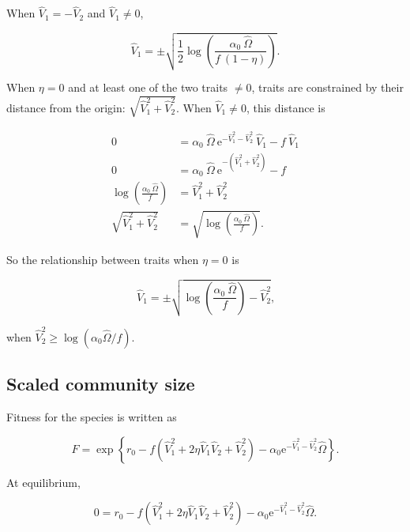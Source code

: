 When $\hat{V}_{1} = - \hat{V}_{2}$ and $\hat{V}_{1} \ne 0$,

$$
    \hat{V}_{1} = \pm \sqrt{\frac{1}{2}
        \log \left( \frac{ \alpha_0 ~ \hat{\Omega} }{ f ~ ( 1 - \eta ) } \right) }
    \textrm{.}
$$


When $\eta = 0$ and at least one of the two traits $\ne 0$,
traits are constrained by their distance
from the origin: $\sqrt{\hat{V}_{1}^2 + \hat{V}_{2}^2}$.
When $\hat{V}_{1} \ne 0$, this distance is

\begin{equation*}
\begin{split}
    0 &= \alpha_0 ~ \hat{\Omega} ~
            \textrm{e}^{-\hat{V}_{1}^2 - \hat{V}_{2}^2} ~ \hat{V}_{1}
        - f ~ \hat{V}_{1} \\
    0 &= \alpha_0 ~ \hat{\Omega} ~
        \textrm{e}^{- ( \hat{V}_{1}^2 + \hat{V}_{2}^2) }
        - f \\
    \log \left( \frac{\alpha_0 ~ \hat{\Omega}}{ f } \right) &=
        \hat{V}_{1}^2 + \hat{V}_{2}^2 \\
     \sqrt{ \hat{V}_{1}^2 + \hat{V}_{2}^2 } &=
        \sqrt{ \log \left( \frac{\alpha_0 ~ \hat{\Omega}}{ f } \right)}
    \textrm{.}
\end{split}
\end{equation*}

So the relationship between traits when $\eta = 0$ is

$$
    \hat{V}_{1} =
    \pm \sqrt{
        \log \left( \frac{\alpha_0 ~ \hat{\Omega}}{ f } \right) -
        \hat{V}_{2}^2
    }
    \textrm{,}
$$

when $\hat{V}_{2}^2 \ge \log (\alpha_0 \hat{\Omega} / f)$.


\subsection*{Scaled community size}

Fitness for the species is written as

$$
    F = \exp \left\{
        r_0 - f ( \hat{V}_{1}^2 + 2 \eta \hat{V}_{1} \hat{V}_{2} + \hat{V}_{2}^2 ) -
        \alpha_0 \textrm{e}^{ - \hat{V}_{1}^2 - \hat{V}_{2}^2 } \hat{\Omega}
    \right\}
    \textrm{.}
$$


At equilibrium,

$$
    0 = r_0 - f ( \hat{V}_{1}^2 + 2 \eta \hat{V}_{1} \hat{V}_{2} + \hat{V}_{2}^2 ) -
        \alpha_0 \textrm{e}^{ - \hat{V}_{1}^2 - \hat{V}_{2}^2 } \hat{\Omega}
    \textrm{.}
$$


